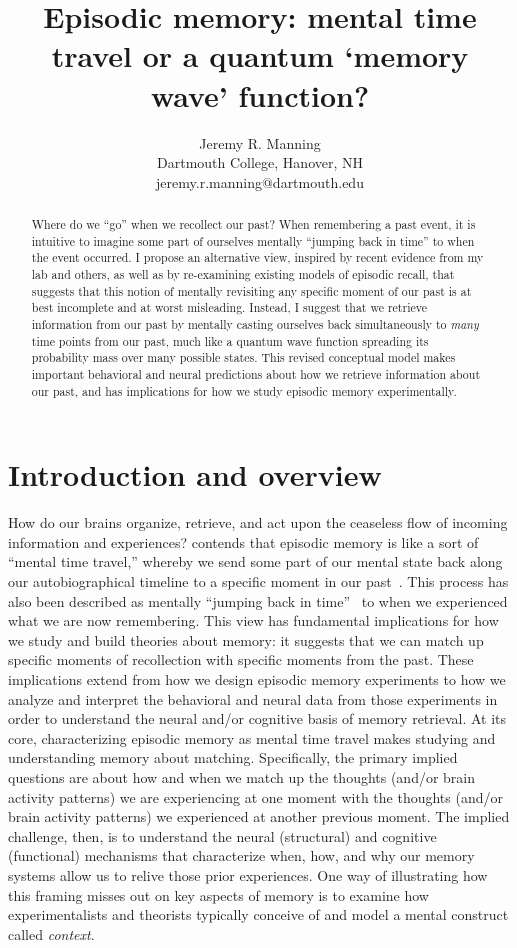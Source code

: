 \documentclass{article}
\title{Episodic memory: mental time travel or a quantum `memory wave' function?}
\author{Jeremy R. Manning\\Dartmouth College, Hanover, NH\\jeremy.r.manning@dartmouth.edu}
\begin{document}
\maketitle

\begin{abstract}
Where do we ``go'' when we recollect our past?  When remembering a past event, it is intuitive to imagine some part of ourselves mentally ``jumping back in time'' to when the event occurred. I propose an alternative view, inspired by recent evidence from my lab and others, as well as by re-examining existing models of episodic recall, that suggests that this notion of mentally revisiting any specific moment of our past is at best incomplete and at worst misleading.  Instead, I suggest that we retrieve information from our past by mentally casting ourselves back simultaneously to \textit{many} time points from our past, much like a quantum wave function spreading its probability mass over many possible states.  This revised conceptual model makes important behavioral and neural predictions about how we retrieve information about our past, and has implications for how we study episodic memory experimentally.
\end{abstract}

\section*{Introduction and overview}
How do our brains organize, retrieve, and act upon the ceaseless flow of incoming information and experiences?  \cite{Tulv83} contends that episodic memory is like a sort of ``mental time travel,'' whereby we send some part of our mental state back along our autobiographical timeline to a specific moment in our past~\citep[also see][]{Tulv72, HassEtal07b, SchaEtal07, MannEtal11}.  This process has also been described as mentally ``jumping back in time''~\citep[e.g.,][]{HowaEtal12, FolkEtal18} to when we experienced what we are now remembering.  This view has fundamental implications for how we study and build theories about memory: it suggests that we can match up specific moments of recollection with specific moments from the past.  These implications extend from how we design episodic memory experiments to how we analyze and interpret the behavioral and neural data from those experiments in order to understand the neural and/or cognitive basis of memory retrieval.  At its core, characterizing episodic memory as mental time travel makes studying and understanding memory about matching.  Specifically, the primary implied questions are about how and when we match up the thoughts (and/or brain activity patterns) we are experiencing at one moment with the thoughts (and/or brain activity patterns) we experienced at another previous moment.  The implied challenge, then, is to understand the neural (structural) and cognitive (functional) mechanisms that characterize when, how, and why our memory systems allow us to relive those prior experiences.  One way of illustrating how this framing misses out on key aspects of memory is to examine how experimentalists and theorists typically conceive of and model a mental construct called \textit{context}.
\end{document}
